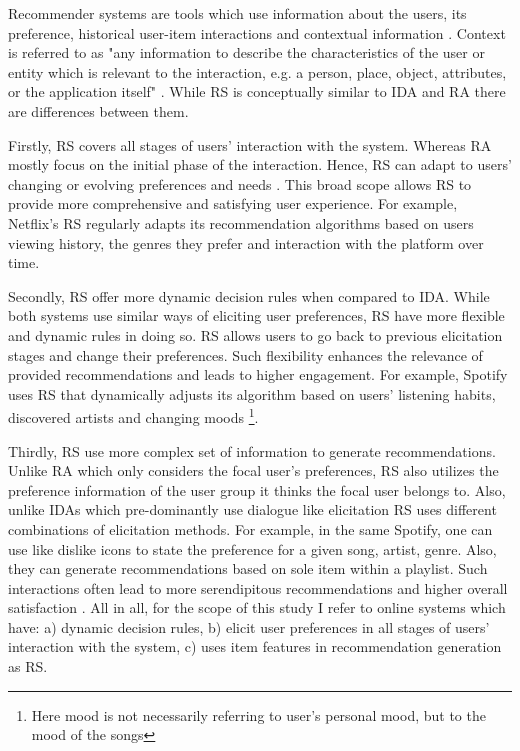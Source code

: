 \documentclass[a4paper,12pt]{article}
\begin{document}
Recommender systems are tools which use information about the users, its preference, historical user-item interactions and contextual information \citep{adomavicius2005toward}. Context is referred to as "any information to describe the characteristics of the user or entity which is relevant to the interaction, e.g. a person, place, object, attributes, or the application itself" \citep{dey2001understanding}.  While RS is conceptually similar to IDA and RA there are differences between them.

Firstly, RS covers all stages of users' interaction with the system. Whereas RA mostly focus on the initial phase of the interaction. Hence, RS can adapt to users' changing or evolving preferences and needs \citep{songWhenHowDiversify2019}. This broad scope allows RS to provide more comprehensive and satisfying user experience. For example, Netflix's RS regularly adapts its recommendation algorithms based on users viewing history, the genres they prefer and interaction with the platform over time.  

Secondly, RS offer more dynamic decision rules when compared to IDA. While both systems use similar ways of eliciting user preferences, RS have more flexible and dynamic rules in doing so. RS allows users to go back to previous elicitation stages and change their preferences. Such flexibility enhances the relevance of provided recommendations and leads to higher engagement. For example, Spotify uses RS that dynamically adjusts its algorithm based on users' listening habits, discovered artists and changing moods \footnote{Here mood is not necessarily referring to user's personal mood, but to the mood of the songs}. 

Thirdly, RS use more complex set of information to generate recommendations. Unlike RA which only considers the focal user's preferences, RS also utilizes the preference information of the user group it thinks the focal user belongs to. Also, unlike IDAs which pre-dominantly use dialogue like elicitation RS uses different combinations of elicitation methods. For example, in the same Spotify, one can use like dislike icons to state the preference for a given song, artist, genre. Also, they can generate recommendations based on sole item within a playlist. Such interactions often lead to more serendipitous recommendations and higher overall satisfaction \citep{kotkovSurveySerendipityRecommender2016}. All in all, for the scope of this study I refer to online systems which have: a) dynamic decision rules, b) elicit user preferences in all stages of users' interaction with the system, c) uses item features in recommendation generation as RS.
\end{document}
